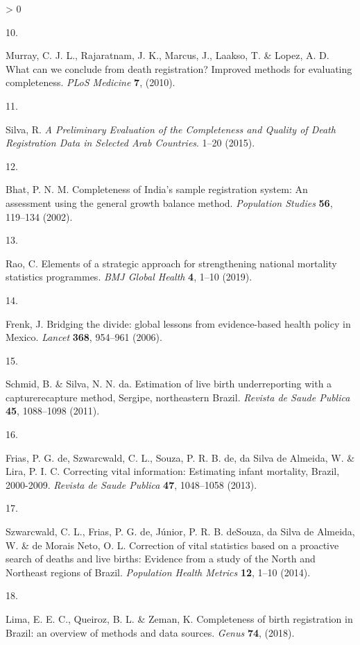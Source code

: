 \documentclass[
]{article}
\newlength{\cslhangindent}
\newlength{\csllabelwidth}
\newenvironment{CSLReferences}[2] %
 {%
  \setlength{\parindent}{0pt}
  \ifodd #1 \everypar{\setlength{\hangindent}{\cslhangindent}}\ignorespaces\fi
  \ifnum #2 > 0
  \setlength{\parskip}{#2\baselineskip}
  \fi
 }%
 {}
\newcommand{\CSLLeftMargin}[1]{\parbox[t]{\csllabelwidth}{#1}}
\newcommand{\CSLRightInline}[1]{\parbox[t]{\linewidth - \csllabelwidth}{#1}\break}
\begin{document}
\begin{CSLReferences}{0}{0}
\leavevmode\hypertarget{ref-Murray2010}{}%
\CSLLeftMargin{10. }
\CSLRightInline{Murray, C. J. L., Rajaratnam, J. K., Marcus, J., Laakso, T. \& Lopez, A. D. {What can we conclude from death registration? Improved methods for evaluating completeness}. \emph{PLoS Medicine} \textbf{7}, (2010).}

\leavevmode\hypertarget{ref-Silva2015}{}%
\CSLLeftMargin{11. }
\CSLRightInline{Silva, R. \emph{{A Preliminary Evaluation of the Completeness and Quality of Death Registration Data in Selected Arab Countries}}. 1--20 (2015).}

\leavevmode\hypertarget{ref-Bhat2002}{}%
\CSLLeftMargin{12. }
\CSLRightInline{Bhat, P. N. M. {Completeness of India's sample registration system: An assessment using the general growth balance method}. \emph{Population Studies} \textbf{56}, 119--134 (2002).}

\leavevmode\hypertarget{ref-Rao2019}{}%
\CSLLeftMargin{13. }
\CSLRightInline{Rao, C. {Elements of a strategic approach for strengthening national mortality statistics programmes}. \emph{BMJ Global Health} \textbf{4}, 1--10 (2019).}

\leavevmode\hypertarget{ref-Frenk2006}{}%
\CSLLeftMargin{14. }
\CSLRightInline{Frenk, J. {Bridging the divide: global lessons from evidence-based health policy in Mexico}. \emph{Lancet} \textbf{368}, 954--961 (2006).}

\leavevmode\hypertarget{ref-Schmid2011}{}%
\CSLLeftMargin{15. }
\CSLRightInline{Schmid, B. \& Silva, N. N. da. {Estimation of live birth underreporting with a capturerecapture method, Sergipe, northeastern Brazil}. \emph{Revista de Saude Publica} \textbf{45}, 1088--1098 (2011).}

\leavevmode\hypertarget{ref-DeFrias2013}{}%
\CSLLeftMargin{16. }
\CSLRightInline{Frias, P. G. de, Szwarcwald, C. L., Souza, P. R. B. de, da Silva de Almeida, W. \& Lira, P. I. C. {Correcting vital information: Estimating infant mortality, Brazil, 2000-2009}. \emph{Revista de Saude Publica} \textbf{47}, 1048--1058 (2013).}

\leavevmode\hypertarget{ref-Szwarcwald2014}{}%
\CSLLeftMargin{17. }
\CSLRightInline{Szwarcwald, C. L., Frias, P. G. de, Júnior, P. R. B. deSouza, da Silva de Almeida, W. \& de Morais Neto, O. L. {Correction of vital statistics based on a proactive search of deaths and live births: Evidence from a study of the North and Northeast regions of Brazil}. \emph{Population Health Metrics} \textbf{12}, 1--10 (2014).}

\leavevmode\hypertarget{ref-Lima2018}{}%
\CSLLeftMargin{18. }
\CSLRightInline{Lima, E. E. C., Queiroz, B. L. \& Zeman, K. {Completeness of birth registration in Brazil: an overview of methods and data sources}. \emph{Genus} \textbf{74}, (2018).}


\end{CSLReferences}
\end{document}
